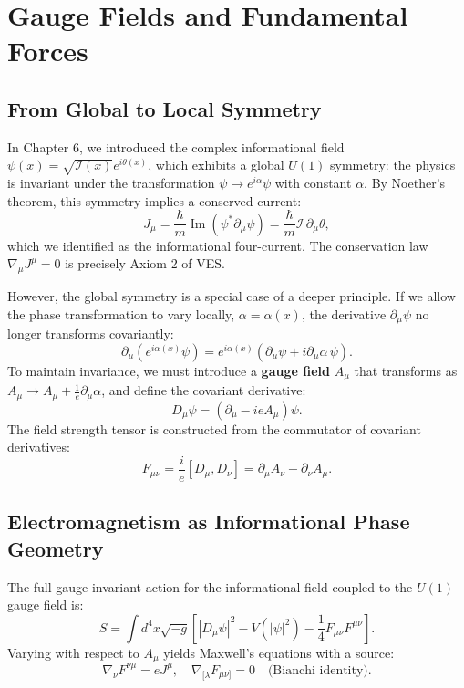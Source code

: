 \documentclass[12pt,a4paper]{book}
\newcommand{\I}{\mathcal{I}}
\begin{document}
\chapter{Gauge Fields and Fundamental Forces}

\section{From Global to Local Symmetry}

In Chapter 6, we introduced the complex informational field $\psi(x) = \sqrt{\I(x)} e^{i\theta(x)}$, which exhibits a global $U(1)$ symmetry: the physics is invariant under the transformation $\psi \rightarrow e^{i\alpha}\psi$ with constant $\alpha$. By Noether's theorem, this symmetry implies a conserved current:
\begin{equation}
    J_\mu = \frac{\hbar}{m} \operatorname{Im}(\psi^* \partial_\mu \psi) = \frac{\hbar}{m} \I \, \partial_\mu \theta,
\end{equation}
which we identified as the informational four-current. The conservation law $\nabla_\mu J^\mu = 0$ is precisely Axiom 2 of VES.

However, the global symmetry is a special case of a deeper principle. If we allow the phase transformation to vary locally, $\alpha = \alpha(x)$, the derivative $\partial_\mu \psi$ no longer transforms covariantly:
\begin{equation}
    \partial_\mu (e^{i\alpha(x)}\psi) = e^{i\alpha(x)} (\partial_\mu \psi + i \partial_\mu \alpha \, \psi).
\end{equation}
To maintain invariance, we must introduce a \textbf{gauge field} $A_\mu$ that transforms as $A_\mu \rightarrow A_\mu + \frac{1}{e} \partial_\mu \alpha$, and define the covariant derivative:
\begin{equation}
    D_\mu \psi = (\partial_\mu - i e A_\mu) \psi.
\end{equation}
The field strength tensor is constructed from the commutator of covariant derivatives:
\begin{equation}
    F_{\mu\nu} = \frac{i}{e} [D_\mu, D_\nu] = \partial_\mu A_\nu - \partial_\nu A_\mu.
\end{equation}

\section{Electromagnetism as Informational Phase Geometry}

The full gauge-invariant action for the informational field coupled to the $U(1)$ gauge field is:
\begin{equation}
    S = \int d^4x \sqrt{-g} \left[ |D_\mu \psi|^2 - V(|\psi|^2) - \frac{1}{4} F_{\mu\nu} F^{\mu\nu} \right].
\end{equation}
Varying with respect to $A_\mu$ yields Maxwell's equations with a source:
\begin{equation}
    \nabla_\nu F^{\nu\mu} = e J^\mu, \quad \nabla_{[\lambda} F_{\mu\nu]} = 0 \quad \text{(Bianchi identity)}.
\end{equation}
\end{document}

